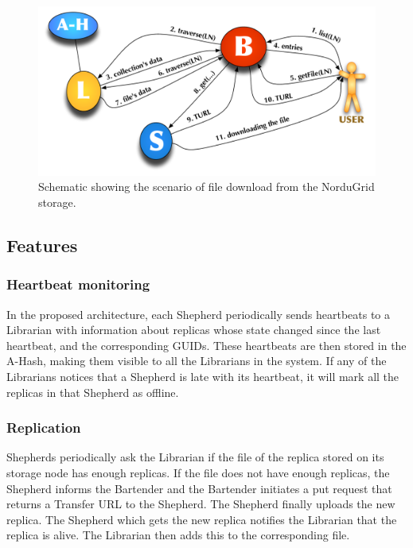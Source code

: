 \documentclass[final]{ieee}
\begin{document}
\begin{figure}
\centering
\includegraphics[width=1.0\columnwidth]{arc1-storage-downloading.pdf}
\caption{Schematic showing the scenario of file download from the NorduGrid storage.}
\label{arc1-storage-downloading}
\end{figure}  


\subsection{Features}
\subsubsection{Heartbeat monitoring}
\label{Heartbeat and Replication}
In the proposed architecture, each Shepherd periodically sends
heartbeats to a Librarian with information about replicas
whose state changed since the last heartbeat, and the corresponding
GUIDs. These heartbeats are then stored in the A-Hash, making them
visible to all the Librarians in the system. If any of the Librarians
notices that a Shepherd is late with its heartbeat, it will mark
all the replicas in that Shepherd as offline.  

\subsubsection{Replication}
\label{Replication}
Shepherds periodically ask the Librarian if the file of the replica stored on
its storage node has enough replicas. If the file does not have
enough replicas, the Shepherd informs the Bartender and the Bartender initiates
a put request that returns a Transfer URL to the Shepherd. The
Shepherd finally uploads the new replica. The Shepherd which gets the new replica notifies the
Librarian that the replica is alive. The Librarian then adds this to
the corresponding file.
\end{document}
